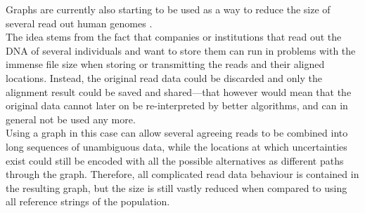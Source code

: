\documentclass[a4paper,12pt,twoside,BCOR=10mm]{scrbook}
\begin{document}
Graphs are currently also starting to be used as a way to reduce the size of several read out human
genomes \citep{Li2014}. \\
The idea stems from the fact that companies or institutions that read out the DNA of several individuals
and want to store them can run in problems with the immense file size when storing or transmitting the reads and their
aligned locations. Instead, the original read data could be discarded and only the alignment result could be saved and shared---that
however would mean that the original data cannot later on be re-interpreted by better algorithms, and can in general
not be used any more. \\
Using a graph in this case can allow several agreeing reads to be combined into long sequences of unambiguous data,
while the locations at which uncertainties exist could still be encoded with all the possible alternatives as
different paths through the graph. Therefore, all complicated read data behaviour is contained in the resulting
graph, but the size is still vastly reduced when compared to using all reference strings of the population.
\end{document}
